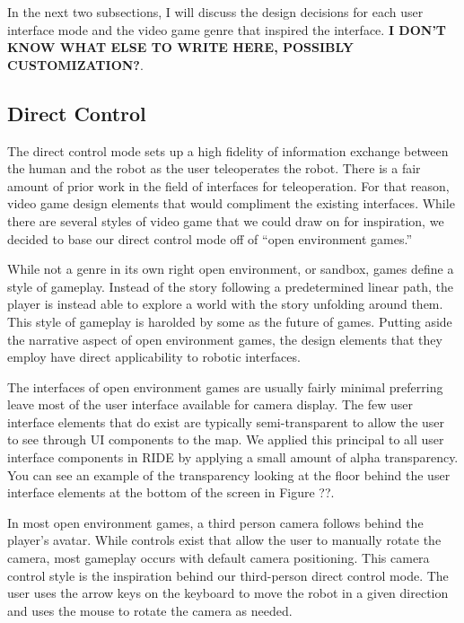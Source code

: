 In the next two subsections, I will discuss the design decisions for each user interface mode and the video game genre that inspired the interface. \textbf{I DON'T KNOW WHAT ELSE TO WRITE HERE, POSSIBLY CUSTOMIZATION?}.

% 
\subsection{Direct Control}

The direct control mode sets up a high fidelity of information exchange between the human and the robot as the user teleoperates the robot. There is a fair amount of prior work in the field of interfaces for teleoperation. For that reason, video game design elements that would compliment the existing interfaces. While there are several styles of video game that we could draw on for inspiration, we decided to base our direct control mode off of ``open environment games.''

While not a genre in its own right open environment, or sandbox, games define a style of gameplay. Instead of the story following a predetermined linear path, the player is instead able to explore a world with the story unfolding around them. This style of gameplay is harolded by some as the future of games. Putting aside the narrative aspect of open environment games, the design elements that they employ have direct applicability to robotic interfaces.

The interfaces of open environment games are usually fairly minimal preferring leave most of the user interface available for camera display. The few user interface elements that do exist are typically semi-transparent to allow the user to see through UI components to the map. We applied this principal to all user interface components in RIDE by applying a small amount of alpha transparency. You can see an example of the transparency looking at the floor behind the user interface elements at the bottom of the screen in Figure ??. 

In most open environment games, a third person camera follows behind the player's avatar. While controls exist that allow the user to manually rotate the camera, most gameplay occurs with default camera positioning. This camera control style is the inspiration behind our third-person direct control mode. The user uses the arrow keys on the keyboard to move the robot in a given direction and uses the mouse to rotate the camera as needed.


